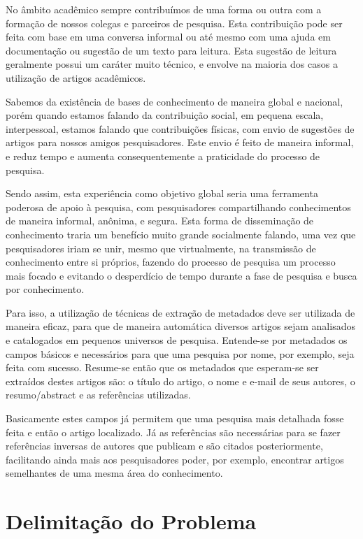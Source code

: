 \documentclass[
	12pt,               %
	openright,          %
	twoside,            %
	a4paper,            %
	english,            %
	brazil              %
	]{abntex2}
\begin{document}
No âmbito acadêmico sempre contribuímos de uma forma ou outra com a formação de nossos colegas e parceiros de pesquisa. Esta contribuição pode ser feita com base em uma conversa informal ou até mesmo com uma ajuda em documentação ou sugestão de um texto para leitura. Esta sugestão de leitura geralmente possui um caráter muito técnico, e envolve na maioria dos casos a utilização de artigos acadêmicos.

Sabemos da existência de bases de conhecimento de maneira global e nacional, porém quando estamos falando da contribuição social, em pequena escala, interpessoal, estamos falando que contribuições físicas, com envio de sugestões de artigos para nossos amigos pesquisadores. Este envio é feito de maneira informal, e reduz tempo e aumenta consequentemente a praticidade do processo de pesquisa.

Sendo assim, esta experiência como objetivo global seria uma ferramenta poderosa de apoio à pesquisa, com pesquisadores compartilhando conhecimentos de maneira informal, anônima, e segura. Esta forma de disseminação de conhecimento traria um benefício muito grande socialmente falando, uma vez que pesquisadores iriam se unir, mesmo que virtualmente, na transmissão de conhecimento entre si próprios, fazendo do processo de pesquisa um processo mais focado e evitando o desperdício de tempo durante a fase de pesquisa e busca por conhecimento.

Para isso, a utilização de técnicas de extração de metadados deve ser utilizada de maneira eficaz, para que de maneira automática diversos artigos sejam analisados e catalogados em pequenos universos de pesquisa. Entende-se por metadados os campos básicos e necessários para que uma pesquisa por nome, por exemplo, seja feita com sucesso. Resume-se então que os metadados que esperam-se ser extraídos destes artigos são: o título do artigo, o nome e e-mail de seus autores, o resumo/abstract e as referências utilizadas.

Basicamente estes campos já permitem que uma pesquisa mais detalhada fosse feita e então o artigo localizado. Já as referências são necessárias para se fazer referências inversas de autores que publicam e são citados posteriormente, facilitando ainda mais aos pesquisadores poder, por exemplo, encontrar artigos semelhantes de uma mesma área do conhecimento.

\section{Delimitação do Problema}
\end{document}
